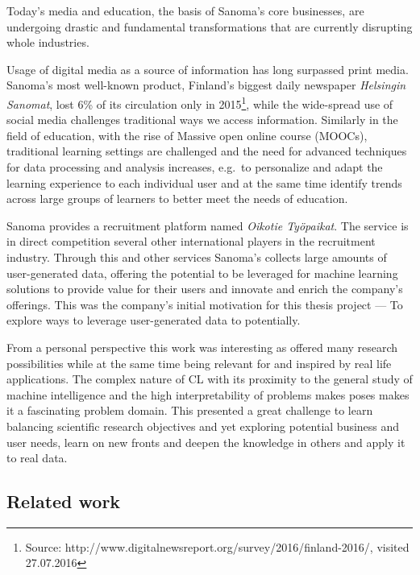 
Today's media and education, the basis of Sanoma's core businesses, are undergoing drastic and fundamental transformations that are currently disrupting whole industries.

Usage of digital media as a source of information has long surpassed print media. Sanoma's most well-known product, Finland's biggest daily newspaper \emph{Helsingin Sanomat}, lost 6\% of its circulation only in 2015\footnote{Source: http://www.digitalnewsreport.org/survey/2016/finland-2016/, visited 27.07.2016}, while the wide-spread use of social media challenges traditional ways we access information. Similarly in the field of education, with the rise of Massive open online course (MOOCs), traditional learning settings are challenged and the need for advanced techniques for data processing and analysis increases, e.g.\ to personalize and adapt the learning experience to each individual user and at the same time identify trends across large groups of learners to better meet the needs of education.

Sanoma provides a recruitment platform named \emph{Oikotie Työpaikat}. The service is in direct competition several other international players in the recruitment industry. Through this and other services Sanoma's collects large amounts of user-generated data, offering the potential to be leveraged for machine learning solutions to provide value for their users and innovate and enrich the company's offerings.
This was the company's initial motivation for this thesis project --- To explore ways to leverage user-generated data to potentially.



From a personal perspective this work was interesting as offered many research possibilities while at the same time being relevant for and inspired by real life applications. The complex nature of \gls{CL} with its proximity to the general study of machine intelligence and the high interpretability of problems makes poses makes it a fascinating problem domain. This presented a great challenge to learn balancing scientific research objectives and yet exploring potential business and user needs, learn on new fronts and deepen the knowledge in others and apply it to real data.

\subsection{Related work}
\label{sub:Related work}

